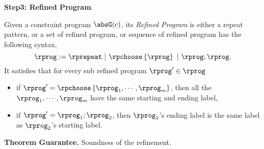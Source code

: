 %
\textbf{Step3: Refined Program}.
\begin{defn}
  Given a constraint program $\absG(c)$,
  its \emph{Refined Program} is either a repeat pattern, or a set of refined program, or sequence of refined program has
  the following syntax,
  \[
    \rprog :=  \rprepeat ~|~ \rpchoose\left\{\rprog\right\} ~|~ \rprog; \rprog.
  \]
  It satisfies that for every sub refined program $\rprog' \in \rprog$
  \begin{itemize}
  \item if
   $\rprog' = \rpchoose\left\{\rprog_1, \cdots, \rprog_m \right\}$,
   then all the $\rprog_1, \cdots, \rprog_m$ have the same starting and ending label,
  \item if $\rprog' = \rprog_1; \rprog_2$, then
  $\rprog_1$'s ending label is the same label as $\rprog_2$'s starting label.
  \end{itemize}
\end{defn}
%
\textbf{Theorem Guarantee.}
Soundness of the refinement.

